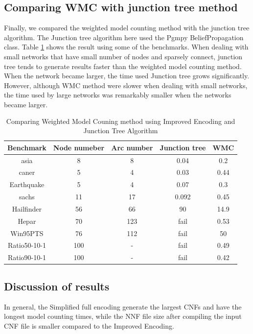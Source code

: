 \subsection{Comparing WMC with junction tree method}
Finally, we compared the weighted model counting method with the junction tree algorithm. The Junction tree algorithm here used the Pgmpy BeliefPropagation class. Table \ref{tab:junctree_vs_WMC} shows the result using some of the benchmarks. When dealing with small networks that have small number of nodes and sparsely connect, junction tree tends to generate results faster than the weighted model counting method. When the network became larger, the time used Junction tree grows significantly. However, although WMC method were slower when dealing with small networks, the time used by large networks was remarkably smaller when the networks became larger. 

\begin{table}[]
    \centering
    \begin{tabular}{c|c c c c}
        \hline
         Benchmark	&	Node numeber	&	Arc number	&	Junction tree	&	WMC	\\
         \hline
         \hline
        asia	&	8	&	8	&	0.04	&	0.2	\\
        caner	&	5	&	4	&	0.03	&	0.44	\\
        Earthquake	&	5	&	4	&	0.07	&	0.3	\\
        sachs	&	11	&	17	&	0.092	&	0.45	\\
        Hailfinder	&	56	&	66	&	90	&	14.9	\\
        Hepar	&	70	&	123	&	fail	&	0.53	\\
        Win95PTS	&	76	&	112	&	fail	&	50	\\
        Ratio50-10-1	&	100	&	-	&	fail	&	0.49	\\
        Ratio90-10-1	&	100	&	-	&	fail	&	0.42	\\
        \hline
    \end{tabular}
    \caption{Comparing Weighted Model Couning method using Improved Encoding and Junction Tree Algorithm}
    \label{tab:junctree_vs_WMC}
\end{table}

\subsection{Discussion of results}
In general, the Simplified full encoding generate the largest CNFs and have the longest model counting times, while the NNF file size after compiling the input CNF file is smaller compared to the Improved Encoding.\\

